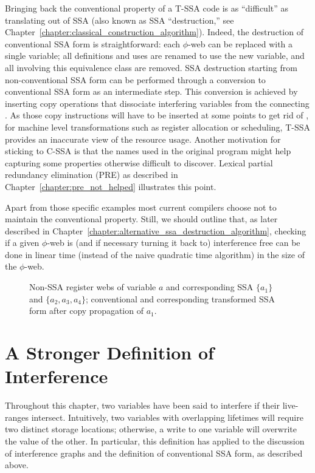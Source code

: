 Bringing back the conventional property of a T-SSA code is as ``difficult'' as translating out of SSA (also known as SSA ``destruction,'' see Chapter~\ref{chapter:classical_construction_algorithm}).
Indeed, the destruction of conventional SSA form
is straightforward: each $\phi$-web can be replaced with a single
variable; all definitions and uses are renamed to use the new variable,
and all \phifuns involving this equivalence class are removed. 
SSA destruction
starting from non-conventional SSA form can be performed through a conversion to 
conventional SSA form as an intermediate step. This conversion is
achieved by inserting copy operations that dissociate interfering variables from the connecting \phifuns. 
As those copy instructions will have to be inserted at some points to get rid of \phifuns, for machine level transformations such as register allocation or scheduling, T-SSA provides an inaccurate view of the resource usage. Another motivation for sticking to C-SSA is that the names used in the original program might help capturing some properties otherwise difficult to discover. Lexical partial redundancy elimination (PRE) as described in Chapter~\ref{chapter:pre_not_helped} illustrates this point.

Apart from those specific examples most current compilers choose not to maintain the conventional property.
Still, we should outline that, as later described in Chapter~\ref{chapter:alternative_ssa_destruction_algorithm}, checking if a given $\phi$-web is (and if necessary turning it back to) interference free can be done in linear time (instead of the naive quadratic time algorithm) in the size of the $\phi$-web.

\begin{figure}[h]
\caption{\protect{} Non-SSA register webs of variable $a$ and
\protect{} corresponding SSA \phiwebs $\{a_1\}$ and $\{a_2,a_3,a_4\}$; 
\protect{} conventional and 
\protect{} corresponding transformed SSA form after copy propagation of $a_1$.}
\label{fig:properties_and_flavors:conventional}
\end{figure}



\section{A Stronger Definition of Interference}
\label{sec:properties_and_flavors:ultimate_interference}
Throughout this chapter, two variables have been said to interfere
if their live-ranges intersect. Intuitively, two variables with overlapping
lifetimes will require two distinct storage locations; otherwise, a write
to one variable will overwrite the value of the other. In particular,
this definition has applied to the discussion of interference graphs
and the definition of conventional SSA form, as described above.

